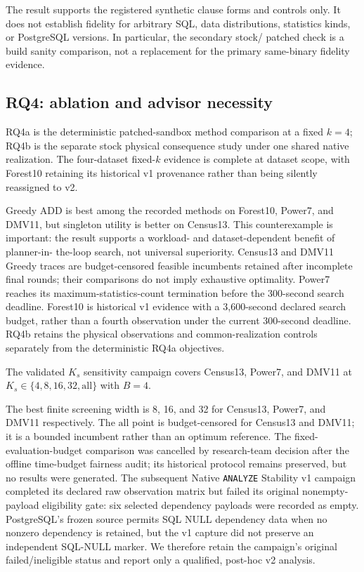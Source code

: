 

The result supports the registered synthetic clause forms and controls only.
It does not establish fidelity for arbitrary SQL, data distributions,
statistics kinds, or PostgreSQL versions. In particular, the secondary stock/
patched check is a build sanity comparison, not a replacement for the primary
same-binary fidelity evidence.

\subsection{RQ4: ablation and advisor necessity}
RQ4a is the deterministic patched-sandbox method comparison at a fixed
$k=4$; RQ4b is the separate stock physical consequence study under one shared
native realization. The four-dataset fixed-$k$ evidence is complete at
dataset scope, with Forest10 retaining its historical v1 provenance rather
than being silently reassigned to v2.



Greedy ADD is best among the recorded methods on Forest10, Power7, and DMV11,
but singleton utility is better on Census13. This counterexample is important:
the result supports a workload- and dataset-dependent benefit of planner-in-
the-loop search, not universal superiority. Census13 and DMV11 Greedy traces
are budget-censored feasible incumbents retained after incomplete final rounds;
their comparisons do not imply exhaustive optimality. Power7 reaches its
maximum-statistics-count termination before the 300-second search deadline.
Forest10 is historical v1 evidence with a 3,600-second declared search
budget, rather than a fourth observation under the current 300-second
deadline. RQ4b retains the physical observations and common-realization
controls separately from the deterministic RQ4a objectives.

The validated $K_s$ sensitivity campaign covers Census13, Power7, and DMV11
at $K_s\in\{4,8,16,32,\mathrm{all}\}$ with $B=4$.



The best finite screening width is 8, 16, and 32 for Census13, Power7, and
DMV11 respectively. The $\mathrm{all}$ point is budget-censored for Census13
and DMV11; it is a bounded incumbent rather than an optimum reference. The
fixed-evaluation-budget comparison was cancelled by research-team decision
after the offline time-budget fairness audit; its historical protocol remains
preserved, but no results were generated. The subsequent Native
\texttt{ANALYZE} Stability v1 campaign
completed its declared raw observation matrix but failed its original
nonempty-payload eligibility gate: six selected dependency payloads were
recorded as empty. PostgreSQL's frozen source permits SQL NULL dependency
data when no nonzero dependency is retained, but the v1 capture did not
preserve an independent SQL-NULL marker. We therefore retain the campaign's
original failed/ineligible status and report only a qualified, post-hoc v2
analysis.

